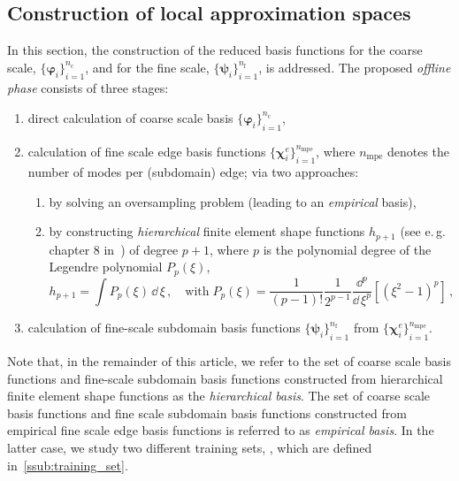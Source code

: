 \documentclass[AMA,STIX1COL,doublespace]{WileyNJD-v2}
\begin{document}
\subsection{Construction of local approximation spaces}%
\label{sub:construction_of_local_approximation_spaces}
In this section, the construction of the reduced basis functions for the coarse scale, ${\{\bm{\varphi}_i\}}_{i=1}^{n_{\mathrm{c}}}$, and for the fine scale, ${\{\bm{\psi}_i\}}_{i=1}^{n_{\mathrm{f}}}$, is addressed.
The proposed \textit{offline phase} consists of three stages:
\begin{enumerate}
	\item direct calculation of coarse scale basis ${\{\bm{\varphi}_i\}}_{i=1}^{n_{\mathrm{c}}}$,
	\item calculation of fine scale edge basis functions ${\{\bm{\chi}^e_i\}}_{i=1}^{n_{\mathrm{mpe}}}$, where $n_{\mathrm{mpe}}$ denotes the number of modes per (subdomain) edge; via two approaches: 
		\begin{enumerate}
			\item by solving an oversampling problem (leading to an \textit{empirical} basis),
			\item by constructing \textit{hierarchical} finite element shape functions ${h}_{p+1}$ (see e.\,g.\, chapter 8 in~\cite{ZienkiewiczTaylor2000}) of degree $p+1$, where $p$ is the polynomial degree of the Legendre polynomial $P_p(\xi)$,
				\begin{equation}
					\label{eq:hierarchical_shapes}
					{h}_{p+1} = \int P_p(\xi)\,\dd\,\xi\,,\quad\mathrm{with}\; P_p(\xi)=\frac{1}{(p-1)!}\frac{1}{2^{p-1}}\frac{\dd^p}{\dd\,\xi^p}[{(\xi^2 -1)}^p]\,,
				\end{equation}
		\end{enumerate}
	\item calculation of fine-scale subdomain basis functions ${\{\bm{\psi}_i\}}_{i=1}^{n_{\mathrm{f}}}$ from ${\{\bm{\chi}^e_i\}}_{i=1}^{n_{\mathrm{mpe}}}$.
\end{enumerate}
Note that, in the remainder of this article, we refer to the set of coarse scale basis functions and fine-scale subdomain basis functions constructed from hierarchical finite element shape functions as the \textit{hierarchical basis}.
The set of coarse scale basis functions and fine scale subdomain basis functions constructed from empirical fine scale edge basis functions is referred to as \textit{empirical basis}.
In the latter case, we study two different  training sets,
,  which are defined in~\cref{ssub:training_set}.
\end{document}
